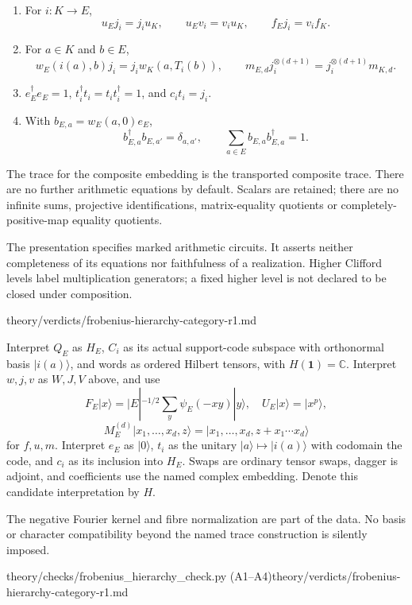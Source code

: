 \begin{definition}
\begin{enumerate}
$j_jj_i=j_{ji}$ and $v_jv_i=v_{ji}$.
\item For $i:K\to E$,
\[
 u_Ej_i=j_iu_K,\qquad u_Ev_i=v_iu_K,\qquad f_Ej_i=v_if_K.
\]
\item For $a\in K$ and $b\in E$,
\[
 w_E(i(a),b)j_i=j_iw_K(a,T_i(b)),\qquad
 m_{E,d}j_i^{\otimes(d+1)}=j_i^{\otimes(d+1)}m_{K,d}.
\]
\item $e_E^\dagger e_E=1$, $t_i^\dagger t_i=t_it_i^\dagger=1$,
and $c_it_i=j_i$.
\item With $b_{E,a}=w_E(a,0)e_E$,
\[
 b_{E,a}^\dagger b_{E,a'}=\delta_{a,a'},\qquad
 \sum_{a\in E}b_{E,a}b_{E,a}^\dagger=1.
\]
\end{enumerate}
The trace for the composite embedding is the transported composite trace.
There are no further arithmetic equations by default. Scalars are retained;
there are no infinite sums, projective identifications, matrix-equality
quotients or completely-positive-map equality quotients.
\end{definition}
\begin{scope}
The presentation specifies marked arithmetic circuits. It asserts neither
completeness of its equations nor faithfulness of a realization. Higher
Clifford levels label multiplication generators; a fixed higher level is
not declared to be closed under composition.
\end{scope}
{theory/verdicts/frobenius-hierarchy-category-r1.md}

\begin{definition}
Interpret $Q_E$ as $H_E$, $C_i$ as its actual support-code subspace with
orthonormal basis $|i(a)\rangle$, and words as ordered Hilbert tensors, with
$H(\mathbf1)=\mathbb C$. Interpret $w,j,v$ as $W,J,V$ above, and use
\[
 F_E|x\rangle=|E|^{-1/2}\sum_y\psi_E(-xy)|y\rangle,\quad
 U_E|x\rangle=|x^p\rangle,
\]
\[
 M_E^{(d)}|x_1,\ldots,x_d,z\rangle
   =|x_1,\ldots,x_d,z+x_1\cdots x_d\rangle
\]
for $f,u,m$. Interpret $e_E$ as $|0\rangle$, $t_i$ as the unitary
$|a\rangle\mapsto|i(a)\rangle$ with codomain the code, and $c_i$ as its
inclusion into $H_E$. Swaps are ordinary tensor swaps, dagger is adjoint,
and coefficients use the named complex embedding. Denote this candidate
interpretation by $H$.
\end{definition}
\begin{scope}
The negative Fourier kernel and fibre normalization are part of the data.
No basis or character compatibility beyond the named trace construction is
silently imposed.
\end{scope}
{theory/checks/frobenius\_hierarchy\_check.py (A1--A4)}{theory/verdicts/frobenius-hierarchy-category-r1.md}

